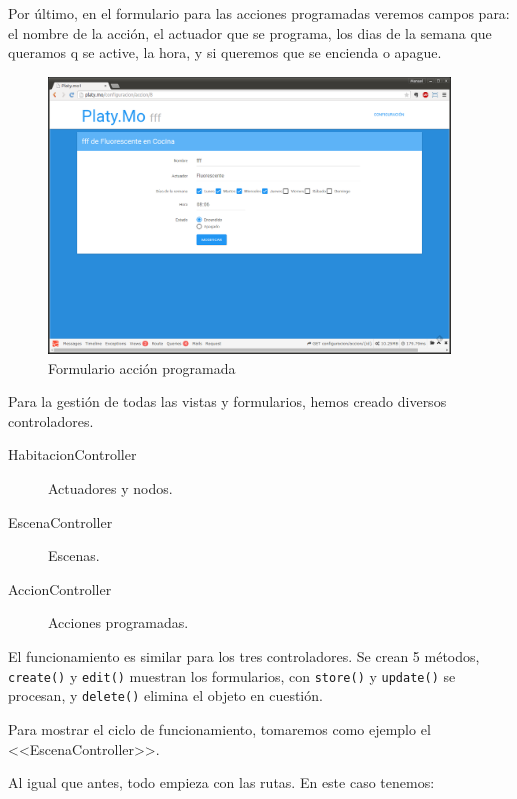     Por último, en el formulario para las acciones programadas veremos campos para: el nombre de la acción, el actuador que se programa, los dias de la semana que queramos q se active, la hora, y si queremos que se encienda o apague.
    
    \begin{figure}[h!]
        \centering
        \includegraphics[width=0.95\textwidth]{imagenes/conf_accion.png}
        \caption{Formulario acción programada}
        \label{fig:form_acc}
    \end{figure}
    
    
    
  Para la gestión de todas las vistas y formularios, hemos creado diversos controladores.
    
    \begin{description}
        \item[HabitacionController] Actuadores y nodos.
        \item[EscenaController] Escenas.
        \item[AccionController] Acciones programadas.
    \end{description}
    
    El funcionamiento es similar para los tres controladores. Se crean 5 métodos, \lstinline|create()| y \lstinline|edit()| muestran los formularios, con \lstinline|store()| y \lstinline|update()| se procesan, y \lstinline|delete()| elimina el objeto en cuestión.
    
    Para mostrar el ciclo de funcionamiento, tomaremos como ejemplo el <<EscenaController>>.
    
    Al igual que antes, todo empieza con las rutas. En este caso tenemos:
    
